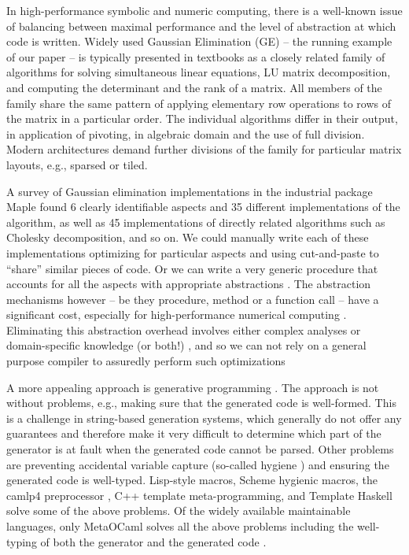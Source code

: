 \documentclass{elsart}
\begin{document}
In high-performance symbolic and numeric computing, there is a
well-known issue of balancing between maximal performance and the
level of abstraction at which code is written. Widely used Gaussian
Elimination (GE) -- the running example of our paper -- is typically
presented in textbooks as a closely related family of algorithms for
solving simultaneous linear equations, LU matrix decomposition, and
computing the determinant and the rank of a matrix. All members of
the family share the same pattern of applying elementary row
operations to rows of the matrix in a particular order. The individual
algorithms differ in their output, in application of pivoting, in
algebraic domain and the use of full division. Modern architectures
demand further divisions of the family for particular matrix layouts, e.g.,
sparsed or tiled.

A survey \cite{Carette06} of
Gaussian elimination implementations in the industrial package Maple
\cite{Monagan:2001:M7P}
found 6 clearly identifiable aspects and 35 different implementations of the
algorithm, as well as 45 implementations of directly related
algorithms such as Cholesky decomposition, and so on.  We could
manually write each of these implementations optimizing for particular aspects
and using cut-and-paste to ``share'' similar pieces of code.
Or we can write a very generic procedure that accounts for
all the aspects with appropriate abstractions \cite{Gruntz:1994:IG,Axiom}. The
abstraction mechanisms however -- be they procedure, method or a
function call -- have a significant cost, especially for
high-performance numerical computing \cite{Carette06}. Eliminating
this abstraction overhead involves either complex analyses or
domain-specific knowledge (or both!)
\cite{Kennedy01Telescoping,Veldhuizen:2004,scp-CohenDGHKP06},
and so we can not rely on a general
purpose compiler to assuredly perform such optimizations 

A more appealing approach is generative programming
\cite{Czarnecki,Veldhuizen:1998:ISCOPE,musser89generic,musser94algorithmoriented,BOOST,POOMA,ATLAS}.
The approach is not without problems, e.g., making sure that the
generated code is well-formed. This is a challenge in string-based
generation systems, which generally do not offer any guarantees and
therefore make it very difficult to determine which part of the
generator is at fault when the generated code cannot be parsed. Other
problems are preventing accidental variable capture (so-called hygiene
\cite{HygienicMacros}) and ensuring the generated code is
well-typed. Lisp-style macros, Scheme hygienic macros, the camlp4
preprocessor \cite{camlp4}, C++ template meta-programming, and Template
Haskell \cite{conf/dagstuhl/CzarneckiOST03} solve some of the above
problems. Of the widely available maintainable languages, only
MetaOCaml \cite{CTHL03,metaocaml-org}  solves all the above problems
including the well-typing of both the generator and 
the generated code \cite{TahaSheard97,TahaThesis}.
\end{document}

